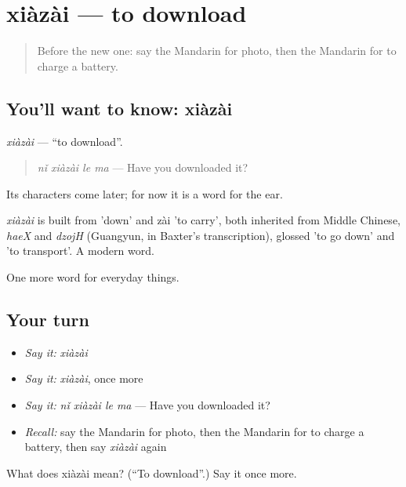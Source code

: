 \section[xiàzài]{xiàzài — to download}

\label{lesson:ZH-C109-xiazai}



\begin{quote}
Before the new one: say the Mandarin for photo, then the Mandarin for to charge a battery.
\end{quote}

\subsection*{You'll want to know: xiàzài}
\emph{xiàzài} — \textquotedblleft{}to download\textquotedblright{}.

\begin{quote}
\emph{nǐ xiàzài le ma} — Have you downloaded it?
\end{quote}

Its characters come later; for now it is a word for the ear.

\begin{cousinweb}
\emph{xiàzài} is built from  'down' and zài 'to carry', both inherited from Middle Chinese, \emph{haeX} and \emph{dzojH} (Guangyun, in Baxter's transcription), glossed 'to go down' and 'to transport'. A modern word.
\end{cousinweb}

\begin{grammarlens}[title={What you've built}]
One more word for everyday things.
\end{grammarlens}

\subsection*{Your turn}
\begin{itemize}
\raggedright
  \item \emph{Say it:} \emph{xiàzài}
  \item \emph{Say it:} \emph{xiàzài}, once more
  \item \emph{Say it:} \emph{nǐ xiàzài le ma} — Have you downloaded it?
  \item \emph{Recall:} say the Mandarin for photo, then the Mandarin for to charge a battery, then say \emph{xiàzài} again
\end{itemize}

\begin{tcolorbox}[breakable,colback=teal!4,colframe=teal!35!black,title={Before you move on}]
What does xiàzài mean? (\textquotedblleft{}To download\textquotedblright{}.) Say it once more.
\end{tcolorbox}
